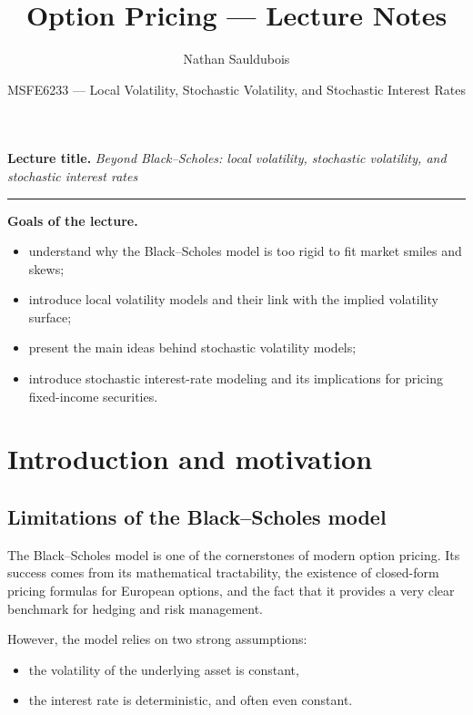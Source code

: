 \documentclass[11pt]{article}
\title{Option Pricing --- Lecture Notes}
\author{Nathan Sauldubois}
\date{MSFE6233 --- Local Volatility, Stochastic Volatility, and Stochastic Interest Rates}
\theoremstyle{plain}
\theoremstyle{definition}
\theoremstyle{remark}
\begin{document}
\maketitle
\vspace{-1em}

\noindent\textbf{Lecture title.}
\emph{Beyond Black--Scholes: local volatility, stochastic volatility, and stochastic interest rates}

\vspace{0.5em}
\hrule
\vspace{1em}

\noindent\textbf{Goals of the lecture.}
\begin{itemize}[leftmargin=1.4em]
    \item understand why the Black--Scholes model is too rigid to fit market smiles and skews;
    \item introduce local volatility models and their link with the implied volatility surface;
    \item present the main ideas behind stochastic volatility models;
    \item introduce stochastic interest-rate modeling and its implications for pricing fixed-income securities.
\end{itemize}

\tableofcontents
\bigskip

\section{Introduction and motivation}

\subsection{Limitations of the Black--Scholes model}

The Black--Scholes model is one of the cornerstones of modern option
pricing.
Its success comes from its mathematical tractability, the existence of
closed-form pricing formulas for European options, and the fact that it
provides a very clear benchmark for hedging and risk management.  

However, the model relies on two strong assumptions:
\begin{itemize}[leftmargin=1.4em]
    \item the volatility of the underlying asset is constant,
    \item the interest rate is deterministic, and often even constant.
\end{itemize}
\end{document}
